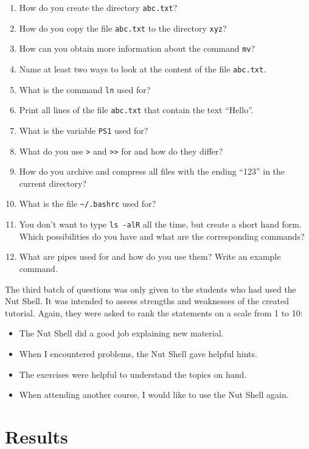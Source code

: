\documentclass[paper=a4,twoside,abstract=on,cleardoublepage=empty,numbers=noenddot,toc=bib,12pt,appendixprefix=true]{scrreprt}
\begin{document}
\begin{enumerate}
    \item How do you create the directory \texttt{abc.txt}?
    \item How do you copy the file \texttt{abc.txt} to the directory \texttt{xyz}?
    \item How can you obtain more information about the command \texttt{mv}?
    \item Name at least two ways to look at the content of the file \texttt{abc.txt}.
    \item What is the command \texttt{ln} used for?
    \item Print all lines of the file \texttt{abc.txt} that contain the text “Hello”.
    \item What is the variable \texttt{PS1} used for?
    \item What do you use \texttt{>} and \texttt{>>} for and how do they differ?
    \item How do you archive and compress all files with the ending “123” in the current directory?
    \item What is the file \texttt{\textasciitilde/.bashrc} used for?
    \item You don't want to type \texttt{ls -alR} all the time, but create a short hand form. Which possibilities do you have and what are the corresponding commands?
    \item What are pipes used for and how do you use them? Write an example command.
\end{enumerate}

The third batch of questions was only given to the students who had used the Nut Shell. It was intended to assess strengths and weaknesses of the created tutorial. Again, they were asked to rank the statements on a scale from 1 to 10:

\begin{itemize}
    \item The Nut Shell did a good job explaining new material.
    \item When I encountered problems, the Nut Shell gave helpful hints.
    \item The exercises were helpful to understand the topics on hand.
    \item When attending another course, I would like to use the Nut Shell again.
\end{itemize}

\section{Results}
\end{document}

